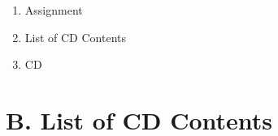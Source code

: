 

{\Large
\begin{enumerate}[label=\Alph*.]
	\item Assignment
	\item List of CD Contents
	\item CD 
\end{enumerate}
}
\pagebreak
\section*{B. List of CD Contents}